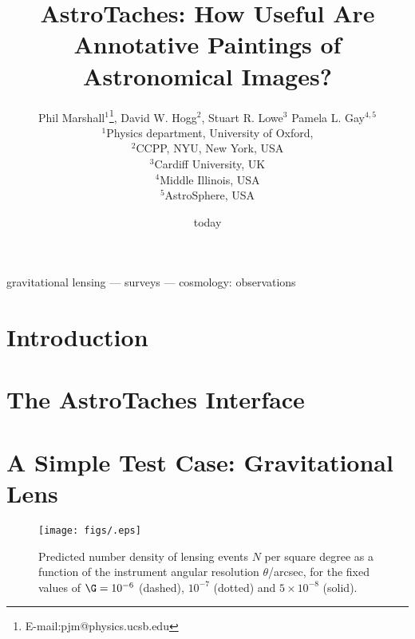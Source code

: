 \documentclass[useAMS,usenatbib]{mn2e}
\title%
[Astronomical Image Annotation]%
{AstroTaches: How Useful Are Annotative Paintings of Astronomical Images?}
\author%
[Marshall et al]%
{Phil Marshall$^{1}$\thanks{E-mail:pjm@physics.ucsb.edu}, 
David W. Hogg$^{2}$,
Stuart R. Lowe$^{3}$
\newauthor Pamela L. Gay$^{4,5}$\\
$^{1}$Physics department, University of Oxford, \\
$^{2}$CCPP, NYU, New York, USA\\
$^{3}$Cardiff University, UK\\
$^{4}$Middle Illinois, USA\\
$^{5}$AstroSphere, USA}
\date{today}
\begin{document}
\maketitle


\begin{abstract}



\end{abstract}


\begin{keywords}
gravitational lensing --- surveys --- cosmology: observations
\end{keywords}



\section{Introduction}



\section{The AstroTaches Interface}
\label{sect:interface}




\section{A Simple Test Case: Gravitational Lens \lens}
\label{sect:testcase}


\begin{figure*}
\begin{center}
\texttt{[image: figs/.eps]} 
\caption{Predicted number density of lensing events $N$ per square degree as a function of the instrument angular resolution $\theta$/arcsec,
for the fixed values of 
    $\G=10^{-6}$ (dashed), 
       $10^{-7}$ (dotted) and
$5\times10^{-8}$ (solid).}\label{fig:bound}
\end{center}
\end{figure*}


\end{document}
